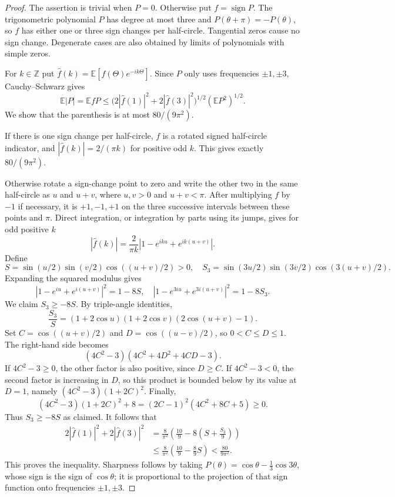 \documentclass[11pt]{article}
\newcommand{\E}{\mathbb E}
\begin{document}
\begin{proof}
The assertion is trivial when $P=0$. Otherwise put $f=\operatorname{sign}P$.
The trigonometric polynomial $P$ has degree at most three and
$P(\theta+\pi)=-P(\theta)$, so $f$ has either one or three sign changes
per half-circle. Tangential zeros cause no sign change. Degenerate cases
are also obtained by limits of polynomials with simple zeros.

For $k\in\mathbb Z$ put
$\widehat f(k)=\E[f(\Theta)e^{-ik\Theta}]$. Since $P$ only uses frequencies
$\pm1,\pm3$, Cauchy--Schwarz gives
\[
 \E|P|=\E fP
 \leq\bigl(2|\widehat f(1)|^2+2|\widehat f(3)|^2\bigr)^{1/2}
       (\E P^2)^{1/2}.
\]
We show that the parenthesis is at most $80/(9\pi^2)$.

If there is one sign change per half-circle, $f$ is a rotated signed
half-circle indicator, and $|\widehat f(k)|=2/(\pi k)$ for positive odd $k$.
This gives exactly $80/(9\pi^2)$.

Otherwise rotate a sign-change point to zero and write the other two in
the same half-circle as $u$ and $u+v$, where $u,v>0$ and $u+v<\pi$.
After multiplying $f$ by $-1$ if necessary, it is $+1,-1,+1$ on the three
successive intervals between these points and $\pi$. Direct integration,
or integration by parts using its jumps, gives for odd positive $k$
\[
 |\widehat f(k)|=\frac2{\pi k}
 \left|1-e^{iku}+e^{ik(u+v)}\right|.
\]
Define
\[
 S=\sin(u/2)\sin(v/2)\cos((u+v)/2)>0,
 \quad
 S_3=\sin(3u/2)\sin(3v/2)\cos(3(u+v)/2).
\]
Expanding the squared modulus gives
\[
 |1-e^{iu}+e^{i(u+v)}|^2=1-8S,
 \quad
 |1-e^{3iu}+e^{3i(u+v)}|^2=1-8S_3.
\]
We claim $S_3\geq-8S$. By triple-angle identities,
\[
 \frac{S_3}{S}
 =(1+2\cos u)(1+2\cos v)(2\cos(u+v)-1).
\]
Set $C=\cos((u+v)/2)$ and $D=\cos((u-v)/2)$, so $0<C\leq D\leq1$.
The right-hand side becomes
\[
 (4C^2-3)(4C^2+4D^2+4CD-3).
\]
If $4C^2-3\geq0$, the other factor is also positive, since $D\geq C$.
If $4C^2-3<0$, the second factor is increasing in $D$, so this product
is bounded below by its value at $D=1$, namely
$(4C^2-3)(1+2C)^2$. Finally,
\[
 (4C^2-3)(1+2C)^2+8
 =(2C-1)^2(4C^2+8C+5)\geq0.
\]
Thus $S_3\geq-8S$ as claimed. It follows that
\begin{align*}
 2|\widehat f(1)|^2+2|\widehat f(3)|^2
 &=\frac8{\pi^2}\left(\frac{10}{9}
                 -8\left(S+\frac{S_3}{9}\right)\right)\\
 &\leq\frac8{\pi^2}\left(\frac{10}{9}-\frac89 S\right)
 <\frac{80}{9\pi^2}.
\end{align*}
This proves the inequality. Sharpness follows by taking
$P(\theta)=\cos\theta-\frac13\cos3\theta$, whose sign is the sign of
$\cos\theta$; it is proportional to the projection of that sign function
onto frequencies $\pm1,\pm3$.
\end{proof}
\end{document}
